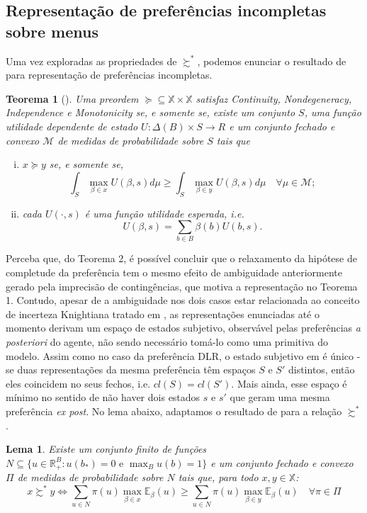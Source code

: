\documentclass[11pt, a4paper]{article}
\theoremstyle{nonumberplain}
\theoremstyle{plain}
\newtheorem{theorem}{Teorema}
\theoremstyle{plain}
\theoremstyle{plain}
\newtheorem{lemma}{Lema}
\theoremstyle{nonumberplain}
\begin{document}
\subsection{Representação de preferências incompletas sobre menus}
Uma vez exploradas as propriedades de $\succsim^*$, podemos enunciar o resultado de \cite{Kochov2007} para representação de preferências incompletas.
\begin{theorem}[\cite{Kochov2007}]\label{kochov} Uma preordem $\succcurlyeq\subseteq\mathbb{X}\times\mathbb{X}$ satisfaz \emph{Continuity}, \emph{Nondegeneracy}, \emph{Independence} e \emph{Monotonicity} se, e somente se, existe um conjunto $S$, uma função utilidade dependente de estado $U:\Delta(B)\times S\rightarrow R$ e um conjunto fechado e convexo $\mathcal{M}$ de medidas de probabilidade sobre $S$ tais que
\begin{enumerate}[(i)]
\item $x\succcurlyeq y$ se, e somente se, $$ \int_{S} \max_{\beta\in x}U(\beta,s)d\mu \geq \int_{S} \max_{\beta\in y}U(\beta,s)d\mu\quad \forall\mu\in\mathcal{M};$$
\item cada $U(\cdot,s)$ é uma função utilidade esperada, i.e. $$U(\beta,s)=\sum_{b\in B} \beta(b)U(b,s).$$
\end{enumerate}
\end{theorem}
Perceba que, do Teorema 2, é possível concluir que o relaxamento da hipótese de completude da preferência tem o mesmo efeito de ambiguidade anteriormente gerado pela imprecisão de contingências, que motiva a representação no Teorema 1. Contudo, apesar de a ambiguidade nos dois casos estar relacionada ao conceito de incerteza Knightiana tratado em \cite{Bewley1986a}, as representações enunciadas até o momento derivam um espaço de estados subjetivo, observável pelas preferências \emph{a posteriori} do agente, não sendo necessário tomá-lo como uma primitiva do modelo.
Assim como no caso da preferência DLR, o estado subjetivo em \cite{Kochov2007} é único - se duas representações da mesma preferência têm espaços $S$ e $S'$ distintos, então eles coincidem no seus fechos, i.e. $cl(S)=cl(S')$. Mais ainda, esse espaço é mínimo no sentido de não haver dois estados $s$ e $s'$ que geram uma mesma preferência \emph{ex post}. No lema abaixo, adaptamos o resultado de \cite{Kochov2007} para a relação $\succsim^*$.
\begin{lemma}\label{nossoKochov} Existe um conjunto finito de funções $N\subseteq\{u \in \mathbb{R}^B_+:u(b_*)=0\text { e }\max_{B}u(b)=1\}$ e um conjunto fechado e convexo $\Pi$ de medidas de probabilidade sobre $N$ tais que, para todo $x,y\in\mathbb{X}$:
$$x\succsim^* y \Leftrightarrow \sum_{u\in N} \pi(u)\max_{\beta\in x}\mathbb{E}_\beta(u) \geq \sum_{u\in N} \pi(u)\max_{\beta\in y}\mathbb{E}_\beta(u)\quad \forall\pi\in\Pi$$
\end{lemma}
\end{document}
